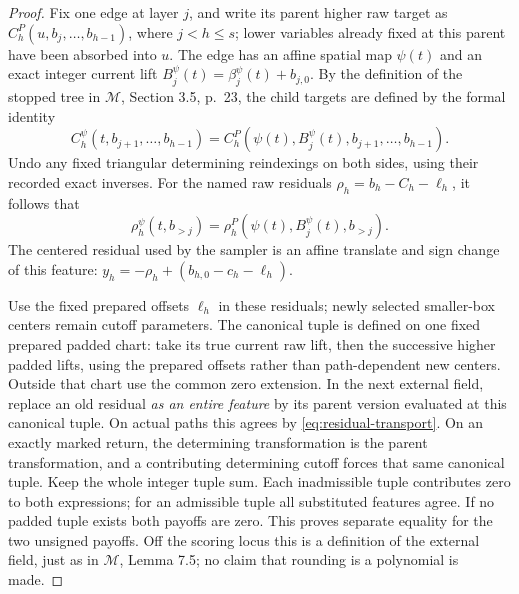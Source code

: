 \documentclass[11pt,a4paper]{article}
\theoremstyle{definition}
\newcommand{\M}{\mathcal M}
\begin{document}
\begin{proof}
Fix one edge at layer \(j\), and write its parent higher raw target as
\(C_h^P(u,b_j,\ldots,b_{h-1})\), where \(j<h\le s\); lower variables already
fixed at this parent have been absorbed into \(u\). The edge has an
affine spatial map \(\psi(t)\) and an exact integer current lift
\(B_j^\psi(t)=\beta_j^\psi(t)+b_{j,0}\). By the definition of the
stopped tree in \(\M\), Section 3.5, p.~23, the child targets are
defined by the formal identity
\begin{equation}\label{eq:target-transport}
 C_h^\psi(t,b_{j+1},\ldots,b_{h-1})
 =C_h^P(\psi(t),B_j^\psi(t),b_{j+1},\ldots,b_{h-1}).
\end{equation}
Undo any fixed triangular determining reindexings on both sides, using
their recorded exact inverses. For the named raw residuals
\(\rho_h=b_h-C_h-\ell_h\), it follows that
\begin{equation}\label{eq:residual-transport}
 \rho_h^\psi(t,b_{>j})
 =\rho_h^P(\psi(t),B_j^\psi(t),b_{>j}).
\end{equation}
The centered residual used by the sampler is an affine translate and
sign change of this feature:
\(y_h=-\rho_h+(b_{h,0}-c_h-\ell_h)\).

Use the fixed prepared offsets \(\ell_h\) in these residuals;
newly selected smaller-box centers remain cutoff parameters. The
canonical tuple is defined on one fixed prepared padded chart:
take its true current raw lift, then the successive higher padded
lifts, using the prepared offsets rather than path-dependent new
centers. Outside that chart use the common zero extension.
In the next external field, replace an old residual \emph{as an entire
feature} by its parent version evaluated at this canonical tuple.
On actual paths this agrees by \eqref{eq:residual-transport}. On an
exactly marked return, the determining transformation is the parent
transformation, and a contributing determining cutoff forces that same
canonical tuple. Keep the whole integer tuple sum. Each inadmissible
tuple contributes zero to both expressions; for an admissible tuple
all substituted features agree. If no padded tuple exists both payoffs
are zero. This proves separate equality for the two unsigned payoffs.
Off the scoring locus this is a definition of the external field, just
as in \(\M\), Lemma 7.5; no claim that rounding is a polynomial is made.


\end{proof}
\end{document}
